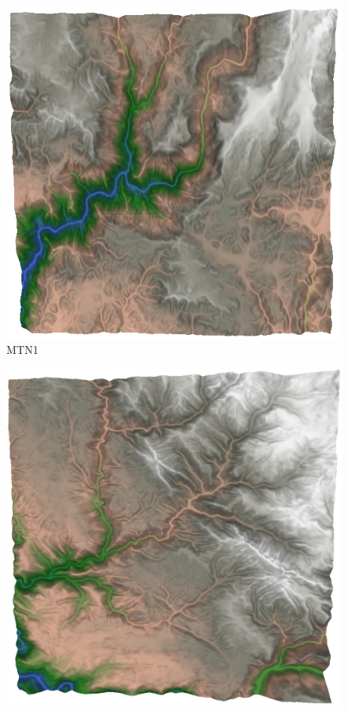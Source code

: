 \begin{figure}[t]
\centering
\begin{minipage}[b]{0.3\linewidth}
\begin{center}
\includegraphics[width=\linewidth]{images/mtn1_normalized.png} \\
MTN1
\end{center}
\end{minipage}
%
\begin{minipage}[b]{0.3\linewidth}
\begin{center}
\includegraphics[width=\linewidth]{images/mtn2_normalized.png} \\

\end{center}
\end{minipage}
\end{figure}
